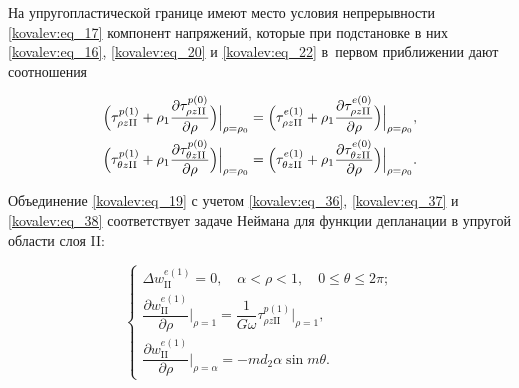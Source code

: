 На упругопластической границе имеют место условия непрерывности \eqref{kovalev:eq_17} компонент напряжений, которые при подстановке в них \eqref{kovalev:eq_16}, \eqref{kovalev:eq_20} и \eqref{kovalev:eq_22} в~первом приближении дают соотношения

 \begin{gather}

\label{kovalev:eq_38}

    \Bigl(\tau_{\rho z\mathrm{II}}^{p(1)}+\rho_1\frac{\partial\tau_{\rho z\mathrm{II}}^{p(0)}}{\partial\rho}\Bigr)\Bigr|_{\rho=\rho_0}=

    \Bigl(\tau_{\rho z\mathrm{II}}^{e(1)}+\rho_1\frac{\partial\tau_{\rho z\mathrm{II}}^{e(0)}}{\partial\rho}\Bigr)\Bigr|_{\rho=\rho_0},

\\

\label{kovalev:eq_39}

    \Bigl(\tau_{\theta z\mathrm{II}}^{p(1)}+\rho_1\frac{\partial\tau_{\theta z\mathrm{II}}^{p(0)}}{\partial\rho}\Bigr)\Bigr|_{\rho=\rho_0}=

    \Bigl(\tau_{\theta z\mathrm{II}}^{e(1)}+\rho_1\frac{\partial\tau_{\theta z\mathrm{II}}^{e(0)}}{\partial\rho}\Bigr)\Bigr|_{\rho=\rho_0}.

 \end{gather}



Объединение \eqref{kovalev:eq_19} с учетом \eqref{kovalev:eq_36}, \eqref{kovalev:eq_37} и \eqref{kovalev:eq_38} соответствует задаче Неймана для функции депланации в упругой области слоя II:

 \begin{equation}

\label{kovalev:eq_40}

  \left\{

  \begin{array}{l}

    \Delta w_{\mathrm{II}}^{e(1)}=0, \quad \alpha<\rho<1, \quad 0\leqslant\theta\leqslant2\pi; \\[5mm]

\dfrac{\partial w_{\mathrm{II}}^{e(1)}}{\partial\rho}\Bigr|_{\rho=1}=

\dfrac1{G\omega}\tau_{\rho z\mathrm{II}}^{p(1)}\Bigr|_{\rho=1}, \\[5mm]

\dfrac{\partial w_{\mathrm{II}}^{e(1)}}{\partial\rho}\Bigr|_{\rho=\alpha}=

    -md_2\alpha\sin m\theta.

  \end{array}

  \right.

 \end{equation}

